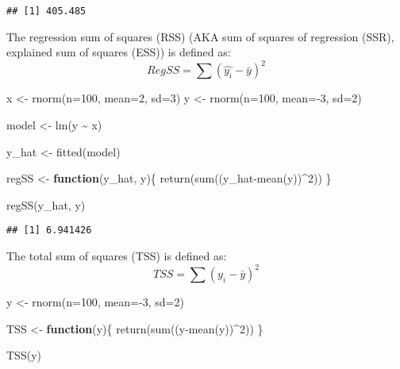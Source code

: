 \documentclass[
]{article}
\newenvironment{Shaded}{\begin{snugshade}}{\end{snugshade}}
\newcommand{\AttributeTok}[1]{\textcolor[rgb]{0.77,0.63,0.00}{#1}}
\newcommand{\ControlFlowTok}[1]{\textcolor[rgb]{0.13,0.29,0.53}{\textbf{#1}}}
\newcommand{\DecValTok}[1]{\textcolor[rgb]{0.00,0.00,0.81}{#1}}
\newcommand{\FunctionTok}[1]{\textcolor[rgb]{0.00,0.00,0.00}{#1}}
\newcommand{\NormalTok}[1]{#1}
\newcommand{\OtherTok}[1]{\textcolor[rgb]{0.56,0.35,0.01}{#1}}
\newcommand{\SpecialCharTok}[1]{\textcolor[rgb]{0.00,0.00,0.00}{#1}}
\begin{document}
\begin{verbatim}
## [1] 405.485
\end{verbatim}

The regression sum of squares (RSS) (AKA sum of squares of regression
(SSR), explained sum of squares (ESS)) is defined as:
\[RegSS=\sum(\hat{y_i}-\bar{y})^2\]

\begin{Shaded}
\begin{Highlighting}[]
\NormalTok{x }\OtherTok{\textless{}{-}} \FunctionTok{rnorm}\NormalTok{(}\AttributeTok{n=}\DecValTok{100}\NormalTok{, }\AttributeTok{mean=}\DecValTok{2}\NormalTok{, }\AttributeTok{sd=}\DecValTok{3}\NormalTok{)}
\NormalTok{y }\OtherTok{\textless{}{-}} \FunctionTok{rnorm}\NormalTok{(}\AttributeTok{n=}\DecValTok{100}\NormalTok{, }\AttributeTok{mean=}\SpecialCharTok{{-}}\DecValTok{3}\NormalTok{, }\AttributeTok{sd=}\DecValTok{2}\NormalTok{)}

\NormalTok{model }\OtherTok{\textless{}{-}} \FunctionTok{lm}\NormalTok{(y }\SpecialCharTok{\textasciitilde{}}\NormalTok{ x)}

\NormalTok{y\_hat }\OtherTok{\textless{}{-}} \FunctionTok{fitted}\NormalTok{(model)}

\NormalTok{regSS }\OtherTok{\textless{}{-}} \ControlFlowTok{function}\NormalTok{(y\_hat, y)\{}
  \FunctionTok{return}\NormalTok{(}\FunctionTok{sum}\NormalTok{((y\_hat}\SpecialCharTok{{-}}\FunctionTok{mean}\NormalTok{(y))}\SpecialCharTok{\^{}}\DecValTok{2}\NormalTok{))}
\NormalTok{\}}

\FunctionTok{regSS}\NormalTok{(y\_hat, y)}
\end{Highlighting}
\end{Shaded}

\begin{verbatim}
## [1] 6.941426
\end{verbatim}

The total sum of squares (TSS) is defined as:
\[TSS=\sum(y_i-\bar{y})^2\]

\begin{Shaded}
\begin{Highlighting}[]
\NormalTok{y }\OtherTok{\textless{}{-}} \FunctionTok{rnorm}\NormalTok{(}\AttributeTok{n=}\DecValTok{100}\NormalTok{, }\AttributeTok{mean=}\SpecialCharTok{{-}}\DecValTok{3}\NormalTok{, }\AttributeTok{sd=}\DecValTok{2}\NormalTok{)}

\NormalTok{TSS }\OtherTok{\textless{}{-}} \ControlFlowTok{function}\NormalTok{(y)\{}
  \FunctionTok{return}\NormalTok{(}\FunctionTok{sum}\NormalTok{((y}\SpecialCharTok{{-}}\FunctionTok{mean}\NormalTok{(y))}\SpecialCharTok{\^{}}\DecValTok{2}\NormalTok{))}
\NormalTok{\}}

\FunctionTok{TSS}\NormalTok{(y)}
\end{Highlighting}
\end{Shaded}
\end{document}
